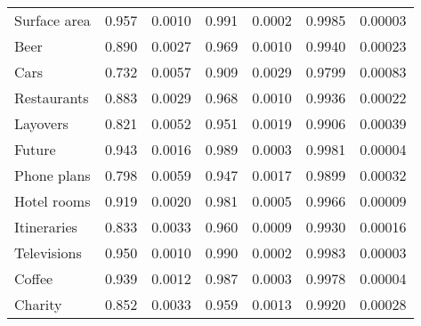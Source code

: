 \begin{tabular}[t]{lrrrrrr}
Surface area & 0.957 & 0.0010 & 0.991 & 0.0002 & 0.9985 & 0.00003\\
Beer & 0.890 & 0.0027 & 0.969 & 0.0010 & 0.9940 & 0.00023\\
Cars & 0.732 & 0.0057 & 0.909 & 0.0029 & 0.9799 & 0.00083\\
Restaurants & 0.883 & 0.0029 & 0.968 & 0.0010 & 0.9936 & 0.00022\\
\addlinespace
Layovers & 0.821 & 0.0052 & 0.951 & 0.0019 & 0.9906 & 0.00039\\
Future & 0.943 & 0.0016 & 0.989 & 0.0003 & 0.9981 & 0.00004\\
Phone plans & 0.798 & 0.0059 & 0.947 & 0.0017 & 0.9899 & 0.00032\\
Hotel rooms & 0.919 & 0.0020 & 0.981 & 0.0005 & 0.9966 & 0.00009\\
Itineraries & 0.833 & 0.0033 & 0.960 & 0.0009 & 0.9930 & 0.00016\\
\addlinespace
Televisions & 0.950 & 0.0010 & 0.990 & 0.0002 & 0.9983 & 0.00003\\
Coffee & 0.939 & 0.0012 & 0.987 & 0.0003 & 0.9978 & 0.00004\\
Charity & 0.852 & 0.0033 & 0.959 & 0.0013 & 0.9920 & 0.00028\\
\bottomrule
\end{tabular}
